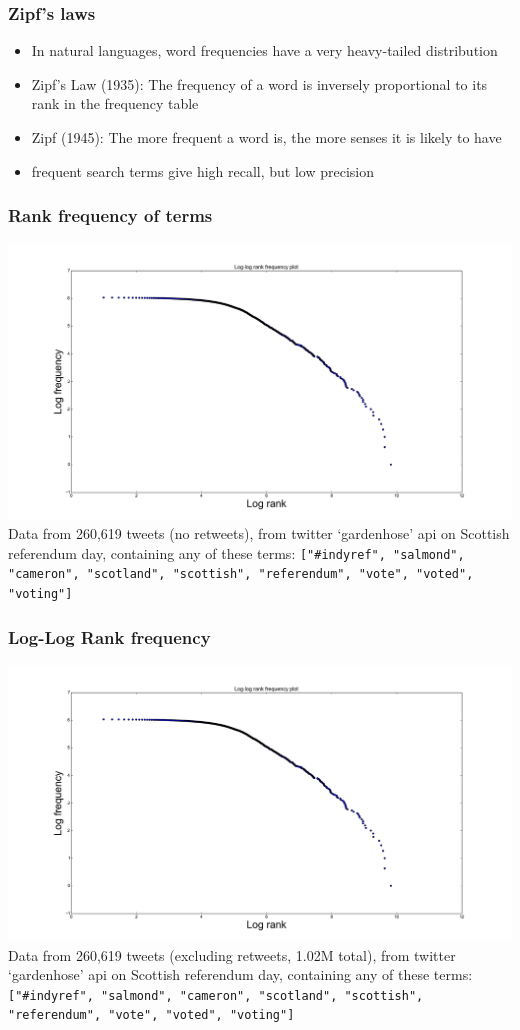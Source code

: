 \documentclass[11pt, table, dvipsnames]{beamer}
\begin{document}
\begin{frame}
  \frametitle{Zipf's laws}
  \begin{itemize}
  \item In natural languages, word frequencies have a very heavy-tailed distribution
  \item Zipf's Law (1935): The frequency of a word is inversely proportional to its rank in the frequency table
  \item Zipf (1945): The more frequent a word is, the more senses it is likely to have
  \item frequent search terms give high recall, but low precision
  \end{itemize}
\end{frame}




\begin{frame}
  \frametitle{Rank frequency of terms}

    \includegraphics[scale=0.20]{zipf1}
  \scriptsize
  Data from 260,619 tweets (no retweets), from twitter `gardenhose' api on Scottish referendum day, containing any of these terms: \texttt{["\#indyref", "salmond", "cameron", "scotland", "scottish", "referendum", "vote", "voted", "voting"]}
\end{frame}

\begin{frame}
  \frametitle{Log-Log Rank frequency}

    \includegraphics[scale=0.20]{zipf2}
  \scriptsize
  Data from 260,619 tweets (excluding retweets, 1.02M total), from twitter `gardenhose' api on Scottish referendum day, containing any of these terms: \texttt{["\#indyref", "salmond", "cameron", "scotland", "scottish", "referendum", "vote", "voted", "voting"]}
\end{frame}
\end{document}
